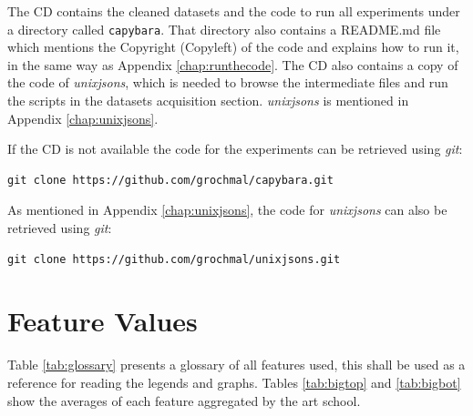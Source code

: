 \documentclass[11pt,a4paper,twoside,openright]{report}
\begin{document}
The CD contains the cleaned datasets and the code to run all experiments under
a directory called \texttt{capybara}.  That directory also contains a README.md
file which mentions the Copyright (Copyleft) of the code and explains how to
run it, in the same way as Appendix \ref{chap:runthecode}.  The CD also
contains a copy of the code of \emph{unixjsons}, which is needed to browse the
intermediate files and run the scripts in the datasets acquisition section.
\emph{unixjsons} is mentioned in Appendix \ref{chap:unixjsons}.

If the CD is not available the code for the experiments can be retrieved using
\emph{git}:

\begin{verbatim}
git clone https://github.com/grochmal/capybara.git
\end{verbatim}

As mentioned in Appendix \ref{chap:unixjsons}, the code for \emph{unixjsons}
can also be retrieved using \emph{git}:

\begin{verbatim}
git clone https://github.com/grochmal/unixjsons.git
\end{verbatim}

\clearpage{\pagestyle{empty}\cleardoublepage}
\chapter{Feature Values}
\label{chap:glossary}

Table \ref{tab:glossary} presents a glossary of all features used, this shall
be used as a reference for reading the legends and graphs.  Tables
\ref{tab:bigtop} and \ref{tab:bigbot} show the averages of each feature
aggregated by the art school.
\end{document}
